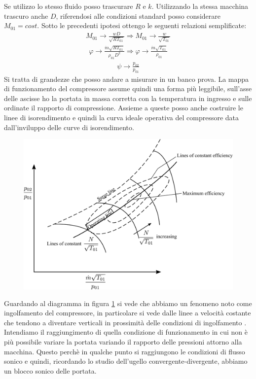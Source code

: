 Se utilizzo lo stesso fluido posso trascurare $R$ e $k$. Utilizzando la stessa macchina trascuro anche $D$, riferendosi alle condizioni standard posso considerare $M_{01}=cost$. Sotto le precedenti ipotesi ottengo le seguenti relazioni semplificate:
\begin{align*}
M_{01} \to \frac{w D}{\sqrt{R T_{01}}} \Rightarrow M_{01} \to \frac{w}{\sqrt{T_{01}}}
\end{align*}
\begin{align*}
\varphi \to \frac{\dot{m} \sqrt{RT_{01}}}{\rho_{01} D^2} \Rightarrow \varphi \to \frac{\dot{m} \sqrt{T_{01}}}{\rho_{01}}
\end{align*}
\begin{align*}
\psi \to \frac{p_{02}}{p_{01}}
\end{align*}
Si tratta di grandezze che posso andare a misurare in un banco prova. 
La mappa di funzionamento del compressore assume quindi una forma più leggibile, sull'asse delle ascisse ho la portata in massa corretta con la temperatura in ingresso e sulle ordinate il rapporto di compressione. Assieme a queste posso anche costruire le linee di isorendimento  e quindi la curva ideale operativa del compressore data dall'inviluppo delle curve di isorendimento.
\begin{figure}
\centering
  \includegraphics[width=.8\textwidth]{fig/secondo_8.pdf}
\caption{}
\label{fig:secondo_8}
\end{figure}
Guardando al diagramma in figura \ref{fig:secondo_8} si vede che abbiamo un fenomeno noto come ingolfamento del compressore, in particolare si vede dalle linee a velocità costante che tendono a diventare verticali in prossimità delle condizioni di ingolfamento . Intendiamo il raggiungimento di quella condizione di funzionamento in cui non è più possibile variare la portata variando il rapporto delle pressioni attorno alla macchina.
Questo perchè in qualche punto si raggiungono le condizioni di flusso sonico e quindi, ricordando lo studio dell'ugello convergente-divergente, abbiamo un
blocco sonico delle portata.

